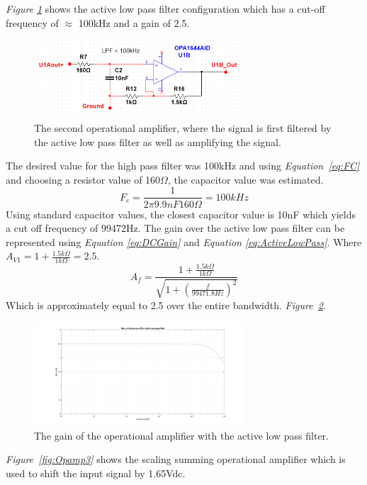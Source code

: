 \textit{Figure \ref{fig:Opamp2}} shows the active low pass filter configuration which has a cut-off frequency of $\approx$ 100kHz and a gain of 2.5.

\begin{figure}[h]
    \centering
    \includegraphics[width=0.7\textwidth]{graphics/OPamp2.png}
    \caption{The second operational amplifier, where the signal is first filtered by the active low pass filter as well as amplifying the signal.}
    \label{fig:Opamp2}
\end{figure}

The desired value for the high pass filter was 100kHz and using \textit{Equation~\ref{eq:FC}} and choosing a resistor value of 160$\Omega$, the capacitor value was estimated.   
$$F_c = \frac{1}{2\pi 9.9nF 160\Omega} = 100kHz$$
Using standard capacitor values, the closest capacitor value is 10nF which yields a cut off frequency of 99472Hz.
The gain over the active low pass filter can be represented using \textit{Equation \ref{eq:DCGain}} and \textit{Equation \ref{eq:ActiveLowPass}}. 
Where $A_{V1} = 1 + \frac{1.5k\Omega}{1k\Omega} = 2.5$.
$$A_f  = \frac{1 + \frac{1.5k\Omega}{1k\Omega}}{\sqrt{1 + (\frac{f}{99471.8Hz})^2}}$$
Which is approximately equal to 2.5 over the entire bandwidth. 
\textit{Figure~\ref{fig:AVlowpass}}.

\begin{figure}[h]
    \centering
    \includegraphics[width=0.7\textwidth]{graphics/Av_Lowpass.png}
    \caption{The gain of the operational amplifier with the active low pass filter.}
    \label{fig:AVlowpass}
\end{figure}

\textit{Figure~\ref{fig:Opamp3}} shows the scaling summing operational amplifier which is used to shift the input signal by 1.65Vdc. 


